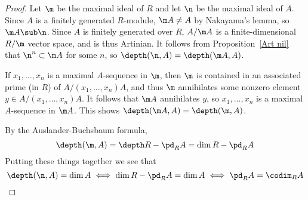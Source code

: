 \begin{proof}
Let $\m$ be the maximal ideal of $R$ and let $\n$ be the maximal ideal
of $A$. Since $A$ is a finitely generated $R$-module, $\m A\neq A$ by Nakayama's lemma, so $\m A\sub\n$. Since $A$ is finitely generated over $R$, $A/\m A$ is a finite-dimensional $R/\m$ vector space, and is thus Artinian. It follows from Proposition~\ref{Art nil} that $\n^n\subset\m A$ for some $n$, so $\depth(\n,A)=\depth(\m A,A)$.\par
If $x_1,\dots,x_n$ is a maximal $A$-sequence in $\m$, then $\m$ is contained in an associated prime (in $R$) of $A/(x_1,\dots,x_n)A$, and thus $\m$ annihilates some nonzero element $y\in A/(x_1,\dots,x_n)A$. It follows that $\m A$ annihilates $y$, so $x_1,\dots,x_n$ is a maximal $A$-sequence in $\m A$. This shows $\depth(\m A,A)=\depth(\m,A)$.\par
By the Auslander-Buchsbaum formula, 
\[\depth(\m,A)=\depth R-\pd_RA=\dim R-\pd_RA\]
Putting these things together we see that
\begin{equation*}
\depth(\n,A)=\dim A\iff \dim R-\pd_RA=\dim A\iff \pd_RA=\codim_RA\qedhere
\end{equation*}
\end{proof}